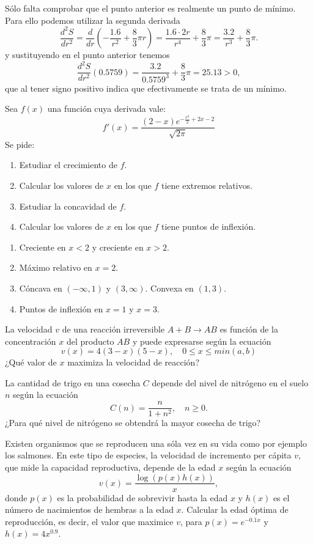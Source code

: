 {Sólo falta comprobar que el punto anterior es realmente un punto de mínimo. Para ello podemos utilizar la segunda derivada
\[
\frac{d^2S}{dr^2} = \frac{d}{dr}\left(-\frac{1.6}{r^2}+\frac{8}{3}\pi r\right) = \frac{1.6\cdot 2r}{r^4}+\frac{8}{3}\pi = \frac{3.2}{r^3}+\frac{8}{3}\pi. 
\]
y sustituyendo en el punto anterior tenemos
\[
\frac{d^2S}{dr^2}(0.5759) =  \frac{3.2}{0.5759^3}+\frac{8}{3}\pi = 25.13 >0,
\]
que al tener signo positivo indica que efectivamente se trata de un mínimo.
}

{Sea $f(x)$ una función cuya derivada vale:
\[
f'(x) = \frac{(2-x) e^{-\frac{x^2}{2}+2x-2}}{\sqrt{2\pi}}
\]
Se pide:
\begin{enumerate}
\item Estudiar el crecimiento de $f$.
\item Calcular los valores de $x$ en los que $f$ tiene extremos relativos.
\item Estudiar la concavidad de $f$.
\item Calcular los valores de $x$ en los que $f$ tiene puntos de inflexión.
\end{enumerate}
}
{\begin{enumerate}
\item Creciente en $x<2$ y creciente en $x>2$.
\item Máximo relativo en $x=2$.
\item Cóncava en $(-\infty,1)$ y $(3,\infty)$. Convexa en $(1,3)$.
\item Puntos de inflexión en $x=1$ y $x=3$.
\end{enumerate}
}
{
}


{La velocidad $v$ de una reacción irreversible $A+B\rightarrow AB$ es función de la concentración $x$ del producto $AB$ y puede expresarse según la ecuación
\[
v(x) = 4(3-x)(5-x),\quad 0\leq x\leq min(a,b)
\]
¿Qué valor de $x$ maximiza la velocidad de reacción?
}
{
}
{
}


{La cantidad de trigo en una cosecha $C$ depende del nivel de nitrógeno en el suelo $n$ según la ecuación
\[
C(n) = \frac{n}{1+n^2},\quad n\geq 0. 
\]
¿Para qué nivel de nitrógeno se obtendrá la mayor cosecha de trigo?
}
{
}
{
}


{Existen organismos que se reproducen una sóla vez en su vida como por ejemplo los salmones. 
En este tipo de especies, la velocidad de incremento per cápita $v$, que mide la capacidad reproductiva, depende de la edad $x$ según la ecuación
\[
v(x) = \frac{\log(p(x)h(x))}{x},
\] 
donde $p(x)$ es la probabilidad de sobrevivir hasta la edad $x$ y $h(x)$ es el número de nacimientos de hembras a la edad $x$. 
Calcular la edad óptima de reproducción, es decir, el valor que maximice $v$, para $p(x)=e^{-0.1x}$ y $h(x)=4x^{0.9}$.}
{
}
{
}


